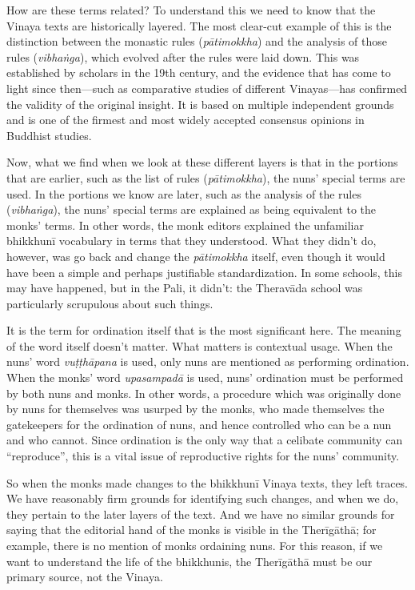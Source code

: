 \documentclass[12pt,openany]{book}%
\begin{document}
How are these terms related? To understand this we need to know that the Vinaya texts are historically layered. The most clear-cut example of this is the distinction between the monastic rules (\textit{\textsanskrit{pātimokkha}}) and the analysis of those rules (\textit{\textsanskrit{vibhaṅga}}), which evolved after the rules were laid down. This was established by scholars in the 19th century, and the evidence that has come to light since then—such as comparative studies of different Vinayas—has confirmed the validity of the original insight. It is based on multiple independent grounds and is one of the firmest and most widely accepted consensus opinions in Buddhist studies.

Now, what we find when we look at these different layers is that in the portions that are earlier, such as the list of rules (\textit{\textsanskrit{pātimokkha}}), the nuns’ special terms are used. In the portions we know are later, such as the analysis of the rules (\textit{\textsanskrit{vibhaṅga}}), the nuns’ special terms are explained as being equivalent to the monks’ terms. In other words, the monk editors explained the unfamiliar \textsanskrit{bhikkhunī} vocabulary in terms that they understood. What they didn’t do, however, was go back and change the \textit{\textsanskrit{pātimokkha}} itself, even though it would have been a simple and perhaps justifiable standardization. In some schools, this may have happened, but in the Pali, it didn’t: the \textsanskrit{Theravāda} school was particularly scrupulous about such things.

It is the term for ordination itself that is the most significant here. The meaning of the word itself doesn’t matter. What matters is contextual usage. When the nuns’ word \textit{\textsanskrit{vuṭṭhāpana}} is used, only nuns are mentioned as performing ordination. When the monks’ word \textit{\textsanskrit{upasampadā}} is used, nuns’ ordination must be performed by both nuns and monks. In other words, a procedure which was originally done by nuns for themselves was usurped by the monks, who made themselves the gatekeepers for the ordination of nuns, and hence controlled who can be a nun and who cannot. Since ordination is the only way that a celibate community can “reproduce”, this is a vital issue of reproductive rights for the nuns’ community.

So when the monks made changes to the \textsanskrit{bhikkhunī} Vinaya texts, they left traces. We have reasonably firm grounds for identifying such changes, and when we do, they pertain to the later layers of the text. And we have no similar grounds for saying that the editorial hand of the monks is visible in the \textsanskrit{Therīgāthā}; for example, there is no mention of monks ordaining nuns. For this reason, if we want to understand the life of the bhikkhunis, the \textsanskrit{Therīgāthā} must be our primary source, not the Vinaya.
\end{document}
